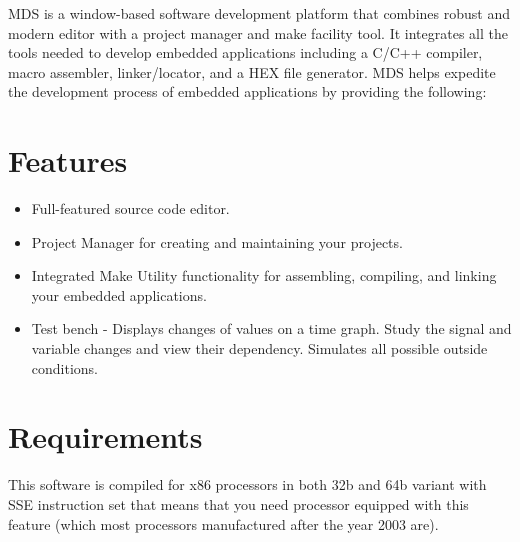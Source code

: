 MDS is a window-based software development platform that combines robust and modern editor with a project manager and make facility tool. It integrates all the tools needed to develop embedded applications including a C/C++ compiler, macro assembler, linker/locator, and a HEX file generator. MDS helps expedite the development process of embedded applications by providing the following:

\section{Features}
    \begin{itemize}
        \item Full-featured source code editor.
        \item Project Manager for creating and maintaining your projects.
        \item Integrated Make Utility functionality for assembling, compiling, and linking your embedded applications.
        \item Test bench - Displays changes of values on a time graph. Study the signal and variable changes and view their dependency. Simulates all possible outside conditions.
    \end{itemize}

\section{Requirements}
    This software is compiled for x86 processors in both 32b and 64b variant with SSE instruction set
    that means that you need processor equipped with this feature (which most processors manufactured after the year 2003 are).
